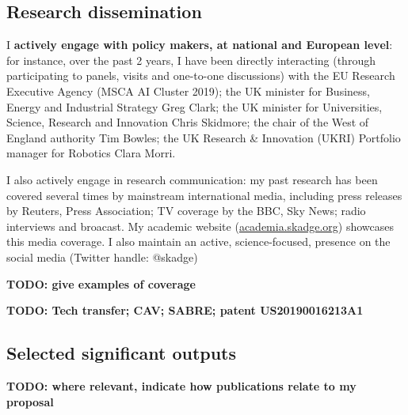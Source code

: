 \documentclass[11pt]{report}
\newcommand{\TODO}[1]{{\color{red}\textbf{TODO: #1}}}
\begin{document}
\subsection{Research dissemination}

I \textbf{actively engage with policy makers, at national and European
level}: for instance, over the past 2 years, I have been directly interacting
(through participating to panels, visits and one-to-one discussions) with the EU
Research Executive Agency (MSCA AI Cluster 2019); the UK minister for Business,
Energy and Industrial Strategy Greg Clark; the UK minister for Universities,
Science, Research and Innovation Chris Skidmore; the chair of the West of
England authority Tim Bowles; the UK Research \& Innovation (UKRI) Portfolio
manager for Robotics Clara Morri.


I also actively engage in research communication: my past research has been
covered several times by mainstream international media, including press
releases by Reuters, Press Association; TV coverage by the BBC, Sky News; radio
interviews and broacast. My academic website (\url{academia.skadge.org})
showcases this media coverage. I also maintain an active, science-focused, presence on the social
media (Twitter handle: @skadge)

\TODO{give examples of coverage}

\TODO{Tech transfer; CAV; SABRE; patent US20190016213A1}

\newpage
\subsection{Selected significant outputs}

\TODO{where relevant, indicate how publications relate to my proposal}
\end{document}
